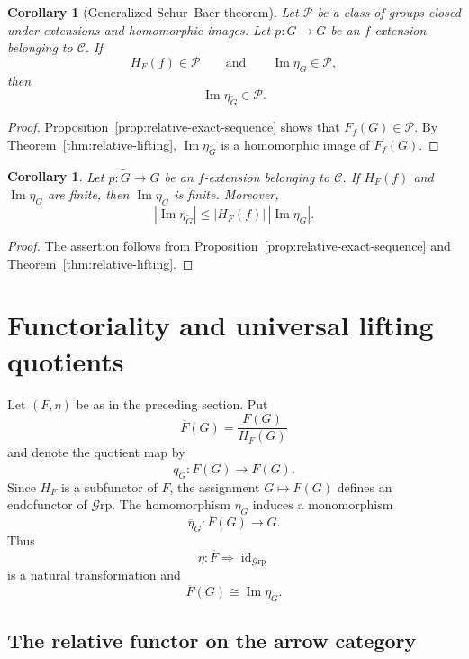 \documentclass[10pt]{amsart}
\newtheorem{corollary}[theorem]{Corollary}
\renewcommand{\*}{\cdot {\dots} \cdot}
\newcommand{\?}[1]{\overset{?}{#1}}
\newcommand{\id}{\operatorname{id}}
\newcommand{\Grp}{\mathcal{G}\text{rp}}
\numberwithin{equation}{section}
\begin{document}
\begin{corollary}[Generalized Schur--Baer theorem]
\label{cor:general-schur-baer}
Let $\mathcal P$ be a class of groups closed under extensions
and homomorphic images. Let
$p\colon\widetilde G\to G$ be an $f$-extension belonging to
$\mathcal C$. If
\[
H_F(f)\in\mathcal P
\qquad\text{and}\qquad
\operatorname{Im}\eta_G\in\mathcal P,
\]
then
\[
\operatorname{Im}\eta_{\widetilde G}\in\mathcal P.
\]
\end{corollary}

\begin{proof}
Proposition~\ref{prop:relative-exact-sequence} shows that
$F_f(G)\in\mathcal P$. By
Theorem~\ref{thm:relative-lifting},
$\operatorname{Im}\eta_{\widetilde G}$ is a homomorphic image
of $F_f(G)$.
\end{proof}

\begin{corollary}\label{cor:relative-finite}
Let $p\colon\widetilde G\to G$ be an $f$-extension belonging to
$\mathcal C$. If $H_F(f)$ and $\operatorname{Im}\eta_G$ are
finite, then $\operatorname{Im}\eta_{\widetilde G}$ is finite.
Moreover,
\[
\left|\operatorname{Im}\eta_{\widetilde G}\right|
\leq
|H_F(f)|\,|\operatorname{Im}\eta_G|.
\]
\end{corollary}

\begin{proof}
The assertion follows from
Proposition~\ref{prop:relative-exact-sequence} and
Theorem~\ref{thm:relative-lifting}.
\end{proof}




\section{Functoriality and universal lifting quotients}
\label{sec:functoriality}

Let $(F,\eta)$ be as in the preceding section. Put
\[
\overline F(G)=\frac{F(G)}{H_F(G)}
\]
and denote the quotient map by
\[
q_G\colon F(G)\longrightarrow\overline F(G).
\]
Since $H_F$ is a subfunctor of $F$, the assignment
$G\mapsto\overline F(G)$ defines an endofunctor of $\Grp$. The
homomorphism $\eta_G$ induces a monomorphism
\[
\overline\eta_G\colon\overline F(G)\longrightarrow G.
\]
Thus
\[
\overline\eta\colon\overline F\Longrightarrow\id_{\Grp}
\]
is a natural transformation and
\[
\overline F(G)\cong\operatorname{Im}\eta_G.
\]

\subsection{The relative functor on the arrow category}
\end{document}
